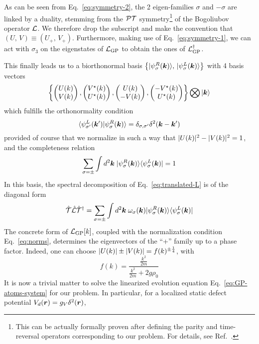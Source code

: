 As can be seen from Eq.~\eqref{eq:symmetry-2}, the 2 eigen-families
$\sigma$ and $-\sigma$ are linked by a duality, stemming from the
$\cal{P} \cal{T}$ symmetry\footnote{This can be actually formally
  proven after defining the parity and time-reversal operators
  corresponding to our problem. For details, see
  Ref.~\cite{MOSTAFAZADEH_2010}.} of the Bogoliubov operator $\mathcal{L}$.
We therefore drop the subscript and make the convention that
$\left( U,\, V \right) \equiv \left( U_{+},\, V_{+}
\right)$. Furthermore, making use of Eq.~\eqref{eq:symmetry-1}, we can
act with $\sigma_3$ on the eigenstates of $\mathcal{L}_{\text{GP}}$ to obtain
the ones of $\mathcal{L}_{\text{GP}}^{\dagger}$. 

This finally leads us to a biorthonormal basis
$\left\{ \vert \psi_\sigma^R(\bm{k}) \rangle,\, \vert \psi_\sigma^L(\bm{k}) \rangle \right\}$
with 4 basis vectors
%
\begin{equation}\label{eq:biorthobasis}
  \left\{ \begin{pmatrix} U(k)\\ V(k) \end{pmatrix}, \begin{pmatrix} V^{\star}(k)\\ U^{\star}(k) \end{pmatrix}, \begin{pmatrix} U(k)\\ -V(k) \end{pmatrix}, \begin{pmatrix} -V^{\star}(k)\\ U^{\star}(k) \end{pmatrix} \right\} \bigotimes \vert \bm{k} \rangle
\end{equation}
% 
which fulfills the orthonormality condition
%
\begin{equation}\label{eq:binormality}
  \langle \psi_{\sigma^{\prime}}^L(\bm{k}^{\prime}) \vert \psi_\sigma^R(\bm{k}) \rangle = \delta_{\sigma,\sigma^{\prime}} \delta^2(\bm{k} - \bm{k}^{\prime})
\end{equation}
% 
provided of course that we normalize in such a way that
$\vert U(k) \vert^2 - \vert V(k) \vert^2 = 1$, and the completeness relation
%
\begin{equation}\label{eq:bicompleteness}
  \sum_{\sigma = \pm} \int d^2 \bm{k} \; \vert \psi_\sigma^R(\bm{k}) \rangle\langle \psi_\sigma^L(\bm{k}) \vert = 1
\end{equation}
% 
In this basis, the spectral decomposition of
Eq.~\eqref{eq:translated-L} is of the diagonal form
%
\begin{equation}\label{eq:bidecomposition}
  \hat{{\cal T}} \hat{\mathcal{L}} \hat{{\cal T}}^{\dagger} = \sum_{\sigma = \pm} \int d^2 \bm{k} \; \omega_\sigma(\bm{k}) \vert \psi_\sigma^R(\bm{k}) \rangle\langle \psi_\sigma^L(\bm{k}) \vert
\end{equation}
% 
The concrete form of $\mathcal{L}_{\text{GP}}[k]$, coupled with the
normalization condition Eq.~\eqref{eq:norms}, determines the
eigenvectors of the ``+'' family up to a phase factor. Indeed, one can
choose $\vert U(k) \vert \pm \vert V(k) \vert = f(k)^{\pm\frac{1}{4}}$, with 
%
\begin{equation}\label{eq:norms}
  f(k) = \frac{\frac{k^2}{2m}}{\frac{k^2}{2m} + 2g\rho_0}
\end{equation}
% 
It is now a trivial matter to solve the linearized evolution equation
Eq.~\eqref{eq:GP-atoms-system} for our problem. In particular, for a
localized static defect potential $V_d(\bm{r}) = g_V \delta^2(\bm{r})$,

